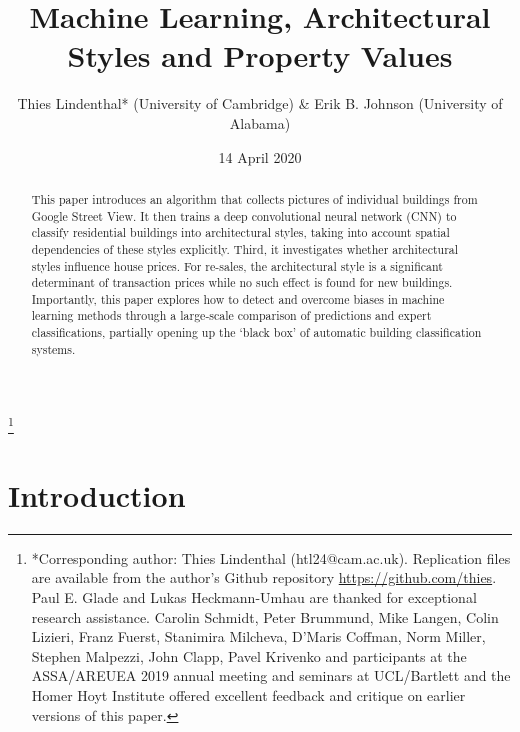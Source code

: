 \documentclass[]{article}
\title{Machine Learning, Architectural Styles and Property Values}
\author{Thies Lindenthal* (University of Cambridge) \& Erik B. Johnson
(University of Alabama)}
\date{14 April 2020}
\begin{document}
\maketitle
\begin{abstract}
This paper introduces an algorithm that collects pictures of individual
buildings from Google Street View. It then trains a deep convolutional
neural network (CNN) to classify residential buildings into
architectural styles, taking into account spatial dependencies of these
styles explicitly. Third, it investigates whether architectural styles
influence house prices. For re-sales, the architectural style is a
significant determinant of transaction prices while no such effect is
found for new buildings. Importantly, this paper explores how to detect
and overcome biases in machine learning methods through a large-scale
comparison of predictions and expert classifications, partially opening
up the `black box' of automatic building classification systems.
\end{abstract}

\let\svthefootnote\thefootnote
\let\thefootnote\relax

\footnote{{*Corresponding author: Thies Lindenthal (htl24@cam.ac.uk). Replication files are available from the author's Github repository \href{https://github.com/thies}{https://github.com/thies}. Paul E. Glade and Lukas Heckmann-Umhau are thanked for exceptional research assistance. Carolin Schmidt, Peter Brummund, Mike Langen, Colin Lizieri, Franz Fuerst, Stanimira Milcheva, D'Maris Coffman, Norm Miller, Stephen Malpezzi, John Clapp, Pavel Krivenko and participants at the ASSA/AREUEA 2019 annual meeting and seminars at UCL/Bartlett and the Homer Hoyt Institute offered excellent feedback and critique on earlier versions of this paper.}}

\addtocounter{footnote}{-1}\let\thefootnote\svthefootnote

\newpage

\hypertarget{introduction}{%
\section{Introduction}\label{introduction}}
\end{document}
